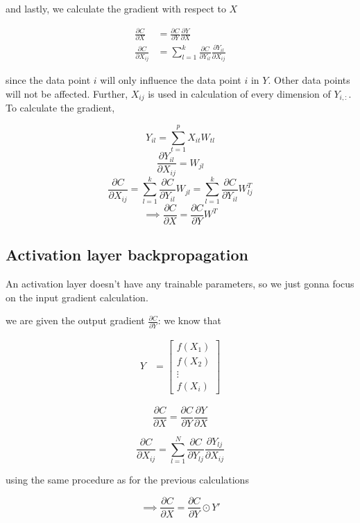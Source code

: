 \documentclass[a4paper, twocolumn, twoside]{article}
\begin{document}
	and lastly, we calculate the gradient with respect to $X$

	\begin{align}
		\frac{\partial C}{\partial X} &= \frac{\partial C}{\partial Y} \frac{\partial Y}{\partial X}\\
		\frac{\partial C}{\partial X_{ij}} &= \sum_{l=1}^{k} \frac{\partial C}{\partial Y_{il}} \frac{\partial Y_{il}}{\partial X_{ij}}
	\end{align}

	since the data point $i$ will only influence the data point $i$ in $Y$. Other data points will not be affected. Further, $X_{ij}$ is used in calculation of every dimension of $Y_{i,:}$. To calculate the gradient,

	$$
		Y_{il} = \sum_{t=1}^{p} X_{it}W_{tl}
	$$
	$$
		\frac{\partial Y_{il}}{\partial X_{ij}} = W_{jl}
	$$
	$$
		\frac{\partial C}{\partial X_{ij}} = \sum_{l=1}^{k} \frac{\partial C}{\partial Y_{il}}W_{jl}
		= \sum_{l=1}^{k} \frac{\partial C}{\partial Y_{il}} W_{lj}^{T}
	$$
	$$
		\implies \frac{\partial C}{\partial X} = \frac{\partial C}{\partial Y} W^{T}
	$$

	\subsection{Activation layer backpropagation}

	An activation layer doesn't have any trainable parameters, so we just gonna focus on the input gradient calculation.

	we are given
	the output gradient $\frac{\partial C}{\partial Y}$:
	we know that 

	\begin{align*}
		Y &= \begin{bmatrix}
		f(X_1) \\
		f(X_2) \\
        \vdots \\
		f(X_i)
	\end{bmatrix}
	\end{align*}

	$$
    \frac{\partial C}{\partial X} = \frac{\partial C}{\partial Y} \frac{\partial Y}{\partial X}
	$$

	$$
    \frac{\partial C}{\partial X_{ij}} = \sum_{l=1}^{N} \frac{\partial C}{\partial Y_{lj}} \frac{\partial Y_{lj}}{\partial X_{ij}}
	$$

	using the same procedure as for the previous calculations

	$$
	\implies \frac{\partial C}{\partial X} = \frac{\partial C}{\partial Y} \odot Y\prime
	$$
\end{document}
